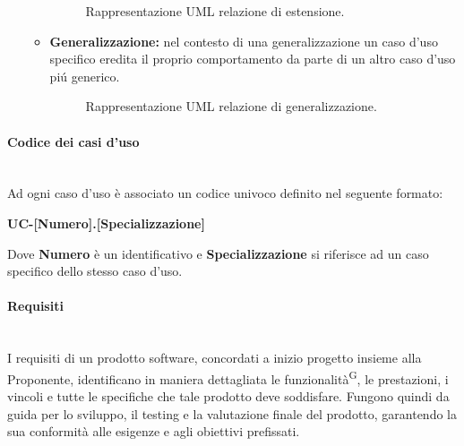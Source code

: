 \documentclass[8pt]{article}
\newcommand{\glossterm}[1]{#1\textsuperscript{G}} %
\newcommand{\subsubsubsection}[1]{\paragraph{#1}\mbox{}\\}
\begin{document}
\begin{itemize}
\begin{itemize}
\begin{figure}[H]
                \caption{Rappresentazione UML relazione di estensione.}
                \label{fig:Rappresentazione UML relazione di estensione}
            \end{figure}
        \item \textbf{Generalizzazione:} nel contesto di una generalizzazione un caso d'uso specifico eredita il proprio comportamento da parte di un altro caso d'uso piú generico. 
            \begin{figure}[H]
                \centering
                \caption{Rappresentazione UML relazione di generalizzazione.}
                \label{fig:Rappresentazione UML relazione di generalizzazione}
            \end{figure}
        \end{itemize}
\end{itemize}
\subsubsubsection{Codice dei casi d'uso}
Ad ogni caso d'uso è associato un codice univoco definito nel seguente formato:
\begin{center}
    \textbf{UC-[Numero].[Specializzazione]}
\end{center}
Dove \textbf{Numero} è un identificativo e \textbf{Specializzazione} si riferisce ad un caso specifico
dello stesso caso d'uso.
\clearpage
\subsubsubsection{Requisiti}
I requisiti di un prodotto software, concordati a inizio progetto insieme alla Proponente, identificano in maniera dettagliata le \glossterm{funzionalità}, le prestazioni, i vincoli e tutte le specifiche che tale prodotto deve soddisfare. Fungono quindi da guida per lo sviluppo, il testing e la valutazione finale del prodotto, garantendo la sua conformità alle esigenze e agli obiettivi prefissati.\\
\end{document}
